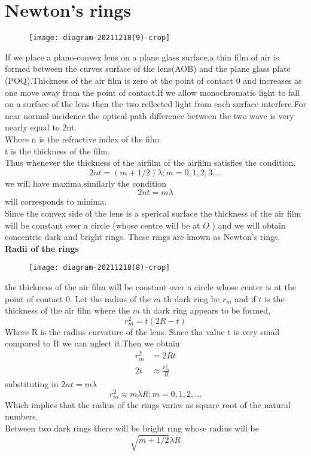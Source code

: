 \section{Newton's rings}
\begin{figure}[H]
	\centering
	\texttt{[image: diagram-20211218(9)-crop]}
	\caption{}
	\label{}
\end{figure}
If we place a plano-convex lens on a plane glass surface,a thin film of air is formed between the curves surface of the lens(AOB) and the plane glass plate (POQ).Thickness of the air film is zero at the point of contact 0 and increases as one move away from the point of contact.If we allow monochromatic light to fall on a surface of the lens then the two reflected light from each surface interfere.For near normal incidence the optical path difference between the two wave is very nearly equal to 2nt.\\
Where n is the refractive index of the film \\
t is the thickness of the film.\\
Thus whenever the thickness of the airfilm of the airfilm satisfies the condition.\\
$$2nt=\left( m+1/2\right) \lambda;m=0,1,2,3....$$we will have maxima.similarly the condition\\
$$2nt =m\lambda$$ will corresponds to minima.\\
Since the convex side of the lens is a sperical surface the thickness of the air film will be constant over a circle (whose centre will be at $O$ ) and we will obtain concentric dark and bright rings. These rings are known as Newton's rings.\\
\textbf{Radii of the rings}\\
\begin{figure}[H]
	\centering
	\texttt{[image: diagram-20211218(8)-crop]}
	\caption{}
	\label{}
\end{figure}
the thickness of the air film will be constant over a circle whose center is at the point of contact $0 .$ Let the radius of the $m$ th dark ring be $r_{m}$ and if $t$ is the thickness of the air film where the $m$ th dark ring appears to be formed, $$r_{m}^{2}=t(2 R-t)$$
Where R is the radius curvature of the lens. Since tha value t is very small compared to R we can nglect it.Then we obtain\\
$$\begin{aligned}
r_{m}^{2} &=2 R t \\
2 t & \approx \frac{r_{m}^{2}}{R}
\end{aligned}$$
substituting in $2nt=m\lambda$ \\
$$r_{m}^{2} \approx m \lambda R ; m=0,1,2, \ldots$$
Which implies that the radius of the rings varies as square root of the natural numbers.\\
Between two dark rings there will be bright ring whose radius will be $$\sqrt{m+1/2}\lambda R$$
